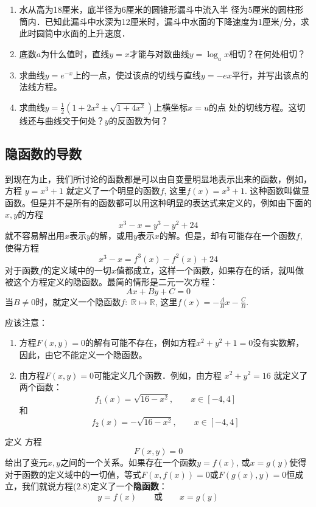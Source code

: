 \begin{ex}
\begin{enumerate}
\item 水从高为18厘米，底半径为6厘米的圆锥形漏斗中流入半
径为5厘米的圆柱形筒内．已知此漏斗中水深为12厘米时，漏斗中水面的下降速度为1厘米/分，求此时圆筒中水面的上升速度．
\item 底数$a$为什么值时，直线$y=x$才能与对数曲线$y=\log_a x$相切？在何处相切？
\item 求曲线$y=e^{-x}$上的一点，使过该点的切线与直线$y=-ex$平行，并写出该点的法线方程。
\item 求曲线$y=\frac{1}{2}(1+2x^2\pm \sqrt{1+4x^2})$上横坐标$x=u$的点
处的切线方程。这切线还与曲线交于何处？$y$的反函数为何？
\end{enumerate}    
\end{ex}

\subsection{隐函数的导数}

到现在为止，我们所讨论的函数都是可以由自变量明显地表示出来的函数，例如，方程
$y=x^3+1$
就定义了一个明显的函数$f$, 这里$f(x)=x^3+1$. 这种函数叫做显函数。但是并不是所有的函数都可以用这种明显的表达式来定义的，例如由下面的$x,y$的方程
\[x^3-x=y^3-y^2+24\]
就不容易解出用$x$表示$y$的解，或用$y$表示$x$的解。但是，却有可能存在一个函数$f$, 使得方程
\[x^3-x=f^3(x)-f^2(x)+24\]
对于函数$f$的定义域中的一切$x$值都成立，这样一个函数，如果存在的话，就叫做被这个方程定义的隐函数。最简的情形是二元一次方程：
\[Ax+By+C=0\]
当$B\ne 0$时，就定义一个隐函数$f:\; \mathbb{R}\mapsto \mathbb{R}$, 这里$f(x)=-\frac{A}{B}x-\frac{C}{B}$. 

应该注意：
\begin{enumerate}
\item 方程$F(x,y)=0$的解有可能不存在，例如方程$x^2+y^2+1=0$没有实数解，因此，由它不能定义一个隐函数。
\item 由方程$F(x,y)=0$可能定义几个函数．例如，由方程
$x^2+y^2=16$
就定义了两个函数：
\[f_1 (x) =\sqrt{16-x^2},\qquad x\in [-4, 4] \]
和
\[f_2 (x) =-\sqrt{16-x^2},\qquad x\in  [-4, 4] \]
\end{enumerate}

\begin{blk}
    {定义} 方程
    \begin{equation}
 F (x,y) =0       
    \end{equation}
给出了变元$x,y$之间的一个关系。如果存在一个函数$y=
f(x)$, 或$x=g(y)$使得对于函数的定义域中的一切值，等式$F(x,f(x))=0$或$F(g(x),y)=0$恒成立，我们就说方程(2.8)定义了一个\textbf{隐函数}：
\[y=f(x)\qquad \text{或}\qquad x=g(y)\]
\end{blk}

